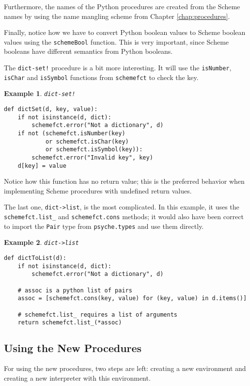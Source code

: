 \documentclass{report}
\newcommand{\code}[1]{\texttt{#1}}
\newcommand{\file}[1]{\texttt{#1}}
\newtheorem{exmp}{Example}[chapter]
\newenvironment{example}[1]
    {\begin{exmp} \textup{#1}
       \begin{small}}
    {  \end{small}
     \end{exmp}}
\begin{document}
Furthermore, the names of the Python procedures are created from the
Scheme names by using the name mangling scheme from Chapter
\ref{chap:procedures}. 

Finally, notice how we have to convert Python boolean values to Scheme
boolean values using the \code{schemeBool} function. This is very
important, since Scheme booleans have different semantics from Python
booleans. 

The \code{dict-set!} procedure is a bit more interesting. It will use
the \code{isNumber}, \code{isChar} and \code{isSymbol} functions from
\file{schemefct} to check the key.

\begin{example}{\code{dict-set!}}
\begin{verbatim}
def dictSet(d, key, value):
    if not isinstance(d, dict):
        schemefct.error("Not a dictionary", d)
    if not (schemefct.isNumber(key)
            or schemefct.isChar(key)
            or schemefct.isSymbol(key)):
        schemefct.error("Invalid key", key)
    d[key] = value
\end{verbatim}
\end{example}

Notice how this function has no return value; this is the preferred
behavior when implementing Scheme procedures with undefined return
values. 

The last one, \code{dict->list}, is the most complicated. In this
example, it uses the \code{schemefct.list\_} and \code{schemefct.cons}
methods; it would also have been correct to import the \code{Pair}
type from \code{psyche.types} and use them directly.

\begin{example}{\code{dict->list}}
\begin{verbatim}
def dictToList(d):
    if not isinstance(d, dict):
        schemefct.error("Not a dictionary", d) 

    # assoc is a python list of pairs
    assoc = [schemefct.cons(key, value) for (key, value) in d.items()]

    # schemefct.list_ requires a list of arguments
    return schemefct.list_(*assoc)
\end{verbatim}
\end{example}


\subsection{Using the New Procedures}
For using the new procedures, two steps are left: creating a new
environment and creating a new interpreter with this environment. 
\end{document}
